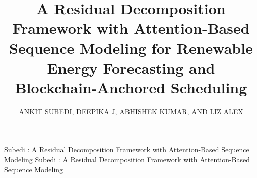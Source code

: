 \documentclass{ieeeaccess}
\begin{document}
\raggedbottom
{}

\title{A Residual Decomposition Framework with Attention-Based Sequence Modeling for Renewable Energy Forecasting and Blockchain-Anchored Scheduling}

\author{\uppercase{Ankit Subedi},
\uppercase{Deepika J},
\uppercase{Abhishek Kumar}, AND
\uppercase{Liz Alex}}

\address[1]{Department of Information Security, School of Computer Science and Engineering, Vellore Institute of Technology, Vellore, 632014 Tamil Nadu, India}
\address[2]{Department of Information Technology, School of Computer Science Engineering and Information Systems, Vellore Institute of Technology, Vellore, 632014 Tamil Nadu, India}
\address[3]{Department of Software Systems, School of Computer Science and Engineering, Vellore Institute of Technology, Vellore,632014 Tamil Nadu, India}


\markboth
{Subedi \headeretal: A Residual Decomposition Framework with Attention-Based Sequence Modeling}
{Subedi \headeretal: A Residual Decomposition Framework with Attention-Based Sequence Modeling}
\end{document}
